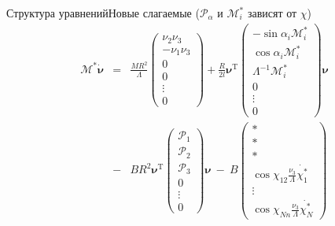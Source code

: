\documentclass{beamer}
\newcommand\ddfrac[2]{\displaystyle\frac{\displaystyle #1}{\displaystyle #2}}
\newcommand\M[0]{\mathcal{M}} %
\newcommand\Prhs[0]{\mathcal{P}} %
\renewcommand{\vec}[1]{\boldsymbol{\mathbf{#1}}}
\begin{document}
\begin{frame}{Структура уравнений}{Новые слагаемые ($\Prhs_\alpha$ и $\M^*_i$ зависят от $\chi$)}    
\begin{eqnarray*}\label{eq:full_system}
\M^*\dot{\vec{\nu}} & = & 
\frac{MR^2}{\Lambda}\left(\begin{matrix}
    \nu_2\nu_3\\
    -\nu_1\nu_3\\
    0\\
    0\\
    \vdots
    \\
    0
\end{matrix}\right)
+
\frac{R}{2l}
\vec{\nu}^\mathrm{T}
\left(\begin{matrix}
    -\sin\alpha_i \M^*_i\\
    \cos\alpha_i \M^*_i\\
    \Lambda^{-1}\M^*_i\\
    0\\
    \vdots
    \\
    0
    \end{matrix}
\right)
\vec{\nu}
\\
 & - & BR^2
\vec{\nu}^\mathrm{T}
\left(\begin{matrix}
    \Prhs_1\\
    \Prhs_2\\
    \Prhs_3\\
    0\\
    \vdots
    \\
    0
\end{matrix}\right)
\vec{\nu}
\ - \
B\left(\begin{matrix}
    *\\
    *\\
    *\\
    \cos\chi_{12}\ddfrac{\nu_3}{\Lambda}\dot{\chi_1^*}\\
    \vdots
    \\
    \cos\chi_{Nn}\ddfrac{\nu_3}{\Lambda}\dot{\chi_N^*}
\end{matrix}\right)
\end{eqnarray*}
\end{frame}
\end{document}
